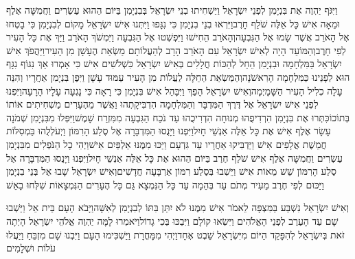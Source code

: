 \documentclass[../main/main.tex]{subfiles}
\begin{document}
\begin{multicols*}{\ncols}
וַיִּגֹּף יַהְוֶה אֶת בִּנְיָמִן לִפְנֵי יִשְׂרָאֵל וַיַּשְׁחִיתוּ בְנֵי יִשְׂרָאֵל בְּבִנְיָמִן בַּיּוֹם הַהוּא עֶשְׂרִים וַחֲמִשָּׁה אֶלֶף וּמֵאָה אִישׁ כָּל אֵלֶּה שֹׁלֵף חָרֶב\PreVerseSpace{}וַיִּרְאוּ בְנֵי בִנְיָמִן כִּי נִגָּפוּ וַיִּתְּנוּ אִישׁ יִשְׂרָאֵל מָקוֹם לְבִנְיָמִן כִּי בָטְחוּ אֶל הָאֹרֵב אֲשֶׁר שָׂמוּ אֶל הַגִּבְעָה\PreVerseSpace{}וְהָאֹרֵב הֵחִישׁוּ וַיִּפְשְׁטוּ אֶל הַגִּבְעָה וַיִּמְשֹׁךְ הָאֹרֵב וַיַּךְ אֶת כָּל הָעִיר לְפִי חָרֶב\PreVerseSpace{}וְהַמּוֹעֵד הָיָה לְאִישׁ יִשְׂרָאֵל עִם הָאֹרֵב הָרָב\SubEnd{} לְהַעֲלוֹתָם מַשְׂאַת הֶעָשָׁן מִן הָעִיר\PreVerseSpace{}וַיַּהֲפֹךְ אִישׁ יִשְׂרָאֵל בַּמִּלְחָמָה וּבִנְיָמִן הֵחֵל לְהַכּוֹת חֲלָלִים בְּאִישׁ יִשְׂרָאֵל כִּשְׁלֹשִׁים אִישׁ כִּי אָמְרוּ אַךְ נִגּוֹף נִגָּף הוּא לְפָנֵינוּ כַּמִּלְחָמָה הָרִאשֹׁנָה\PreVerseSpace{}וְהַמַּשְׂאֵת הֵחֵלָּה לַעֲלוֹת מִן הָעִיר עַמּוּד עָשָׁן וַיִּפֶן בִּנְיָמִן אַחֲרָיו וְהִנֵּה עָלָה כְלִיל הָעִיר הַשָּׁמָיְמָה\PreVerseSpace{}וְאִישׁ יִשְׂרָאֵל הָפַךְ וַיִּבָּהֵל אִישׁ בִּנְיָמִן כִּי רָאָה כִּי נָגְעָה עָלָיו הָרָעָה\PreVerseSpace{}וַיִּפְנוּ לִפְנֵי אִישׁ יִשְׂרָאֵל אֶל דֶּרֶךְ הַמִּדְבָּר וְהַמִּלְחָמָה הִדְבִּיקָתְהוּ וַאֲשֶׁר מֵהֶעָרִים מַשְׁחִיתִים אוֹתוֹ בְּתוֹכוֹ\PreVerseSpace{}כִּתְּרוּ אֶת בִּנְיָמִן הִרְדִיפֻהוּ מְנוּחָה הִדְרִיכֻהוּ עַד נֹכַח הַגִּבְעָה מִמִּזְרַח שָׁמֶשׁ\PreVerseSpace{}וַיִּפְּלוּ מִבִּנְיָמִן שְׁמֹנָה עָשָׂר אֶלֶף אִישׁ אֶת כָּל אֵלֶּה אַנְשֵׁי חָיִל\PreVerseSpace{}וַיִּפְנוּ וַיָּנֻסוּ הַמִּדְבָּרָה אֶל סֶלַע הָרִמּוֹן וַיְעֹלְלֻהוּ בַּמְסִלּוֹת חֲמֵשֶׁת אֲלָפִים אִישׁ וַיַּדְבִּיקוּ אַחֲרָיו עַד גִּדְעָם\SubEnd{} וַיַּכּוּ מִמֶּנּוּ אַלְפַּיִם אִישׁ\PreVerseSpace{}וַיְהִי כָל הַנֹּפְלִים מִבִּנְיָמִן עֶשְׂרִים וַחֲמִשָּׁה אֶלֶף אִישׁ שֹׁלֵף חֶרֶב בַּיּוֹם הַהוּא אֶת כָּל אֵלֶּה אַנְשֵׁי חָיִל\PreVerseSpace{}וַיִּפְנוּ וַיָּנֻסוּ הַמִּדְבָּרָה אֶל סֶלַע הָרִמּוֹן שֵׁשׁ מֵאוֹת אִישׁ וַיֵּשְׁבוּ בְּסֶלַע רִמּוֹן אַרְבָּעָה חֳדָשִׁים\PreVerseSpace{}וְאִישׁ יִשְׂרָאֵל שָׁבוּ אֶל בְּנֵי בִנְיָמִן וַיַּכּוּם לְפִי חֶרֶב מֵעִיר מְתֹם עַד בְּהֵמָה עַד כָּל הַנִּמְצָא גַּם כָּל הֶעָרִים הַנִּמְצָאוֹת שִׁלְּחוּ בָאֵשׁ\OpenSection{}\par
{}וְאִישׁ יִשְׂרָאֵל נִשְׁבַּע בַּמִּצְפָּה לֵאמֹר אִישׁ מִמֶּנּוּ לֹא יִתֵּן בִּתּוֹ לְבִנְיָמִן לְאִשָּׁה\PreVerseSpace{}וַיָּבֹא הָעָם בֵּית אֵל וַיֵּשְׁבוּ שָׁם עַד הָעֶרֶב לִפְנֵי הָאֱלֹהִים וַיִּשְׂאוּ קוֹלָם וַיִּבְכּוּ בְּכִי גָדוֹל\PreVerseSpace{}וַיֹּאמְרוּ לָמָּה יַהְוֶה אֱלֹהֵי יִשְׂרָאֵל הָיְתָה זֹּאת בְּיִשְׂרָאֵל לְהִפָּקֵד הַיּוֹם מִיִּשְׂרָאֵל שֵׁבֶט אֶחָד\PreVerseSpace{}וַיְהִי מִמָּחֳרָת וַיַּשְׁכִּימוּ הָעָם וַיִּבְנוּ שָׁם מִזְבֵּחַ וַיַּעֲלוּ עֹלוֹת וּשְׁלָמִים\OpenSection{}\par

\end{multicols*}
\end{document}
